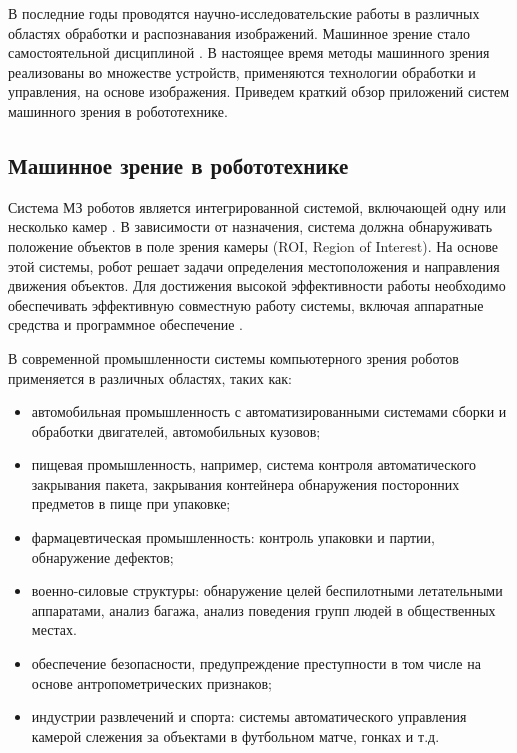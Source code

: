 В последние годы проводятся научно-исследовательские работы в различных областях обработки и распознавания изображений. Машинное зрение стало самостоятельной дисциплиной \cite{Huang1991, Kevin1991}. В настоящее время методы машинного зрения реализованы во множестве устройств, применяются технологии обработки и управления, на основе изображения. Приведем краткий обзор приложений систем машинного зрения в робототехнике.

\subsection{Машинное зрение в робототехнике}

Система МЗ роботов является интегрированной системой, включающей одну или несколько камер \cite{Abebe2016}. В зависимости от назначения, система должна обнаруживать положение объектов в поле зрения камеры (ROI, Region of Interest). На основе этой системы, робот решает задачи определения местоположения и направления движения объектов. Для достижения высокой эффективности работы необходимо обеспечивать эффективную совместную работу системы, включая аппаратные средства и программное обеспечение \cite{Zhu2004, Vayda1991}.

В современной промышленности системы компьютерного зрения роботов применяется в различных областях, таких как:
\begin{itemize}
	\item автомобильная промышленность с автоматизированными системами сборки и обработки двигателей, автомобильных кузовов;
	\item пищевая промышленность, например, система контроля автоматического закрывания пакета, закрывания контейнера  обнаружения посторонних предметов в пище при упаковке;
	\item фармацевтическая промышленность: контроль упаковки и партии, обнаружение дефектов;
	\item военно-силовые структуры: обнаружение целей беспилотными летательными аппаратами, анализ багажа, анализ поведения групп людей в общественных местах.
	\item обеспечение безопасности, предупреждение преступности в том числе на основе антропометрических признаков;
	\item индустрии развлечений и спорта: системы автоматического управления камерой слежения за объектами в футбольном матче, гонках и т.д.
\end{itemize}

